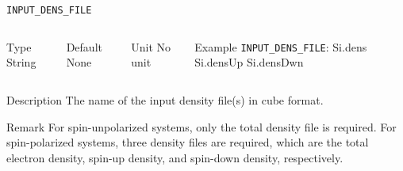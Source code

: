 \begin{frame}[allowframebreaks]{\texttt{INPUT\_DENS\_FILE}} \label{INPUT_DENS_FILE}
\vspace*{-12pt}
\begin{columns}
\begin{block}{Type}
String
\end{block}

\begin{block}{Default}
None
\end{block}

\begin{block}{Unit}
No unit
\end{block}

\begin{block}{Example}
\texttt{INPUT\_DENS\_FILE}: Si.dens Si.densUp Si.densDwn
\end{block}
\end{columns}

\begin{block}{Description}
The name of the input density file(s) in cube format. 
\end{block}

\begin{block}{Remark}
For spin-unpolarized systems, only the total density file is required. For spin-polarized systems, three density files are required, which are the total electron density, spin-up density, and spin-down density, respectively.
\end{block}

\end{frame}
